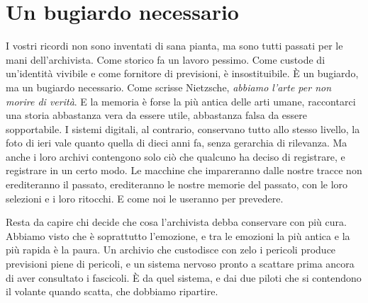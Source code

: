 \section{Un bugiardo necessario}

I vostri ricordi non sono inventati di sana pianta, ma sono tutti passati per le mani dell'archivista. Come storico fa un lavoro pessimo. Come custode di un'identità vivibile e come fornitore di previsioni, è insostituibile. È un bugiardo, ma un bugiardo necessario. Come scrisse Nietzsche, \textit{abbiamo l'arte per non morire di verità}. E la memoria è forse la più antica delle arti umane, raccontarci una storia abbastanza vera da essere utile, abbastanza falsa da essere sopportabile. I sistemi digitali, al contrario, conservano tutto allo stesso livello, la foto di ieri vale quanto quella di dieci anni fa, senza gerarchia di rilevanza. Ma anche i loro archivi contengono solo ciò che qualcuno ha deciso di registrare, e registrare in un certo modo. Le macchine che impareranno dalle nostre tracce non erediteranno il passato, erediteranno le nostre memorie del passato, con le loro selezioni e i loro ritocchi. E come noi le useranno per prevedere.

Resta da capire chi decide che cosa l'archivista debba conservare con più cura. Abbiamo visto che è soprattutto l'emozione, e tra le emozioni la più antica e la più rapida è la paura. Un archivio che custodisce con zelo i pericoli produce previsioni piene di pericoli, e un sistema nervoso pronto a scattare prima ancora di aver consultato i fascicoli. È da quel sistema, e dai due piloti che si contendono il volante quando scatta, che dobbiamo ripartire.
